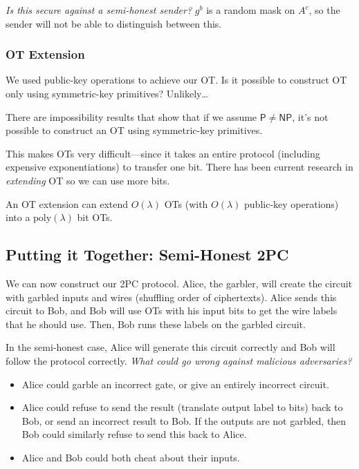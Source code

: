 \emph{Is this secure against a semi-honest sender?} $g^b$ is a random mask on $A^c$, so the sender will not be able to distinguish between this.

\subsubsection{OT Extension}
We used public-key operations to achieve our OT. Is it possible to construct OT only using symmetric-key primitives? Unlikely\dots

There are impossibility results that show that if we assume $\mathsf{P}\neq \mathsf{NP}$, it's not possible to construct an OT using symmetric-key primitives.

This makes OTs very difficult---since it takes an entire protocol (including expensive exponentiations) to transfer one bit. There has been current research in \emph{extending} OT so we can use more bits.

An OT extension can extend $O(\lambda)$ OTs (with $O(\lambda)$ public-key operations) into a $\mathrm{poly}(\lambda)$ bit OTs.


\subsection{Putting it Together: Semi-Honest 2PC}\label{sec:mar23-semihonest-2pc-together}

We can now construct our 2PC protocol. Alice, the garbler, will create the circuit with garbled inputs and wires (shuffling order of ciphertexts). Alice sends this circuit to Bob, and Bob will use OTs with his input bits to get the wire labels that he should use. Then, Bob runs these labels on the garbled circuit.


In the semi-honest case, Alice will generate this circuit correctly and Bob will follow the protocol correctly. \emph{What could go wrong against malicious adversaries?}
\begin{itemize}
    \item Alice could garble an incorrect gate, or give an entirely incorrect circuit.
    \item Alice could refuse to send the result (translate output label to bits) back to Bob, or send an incorrect result to Bob. If the outputs are not garbled, then Bob could similarly refuse to send this back to Alice.
    \item Alice and Bob could both cheat about their inputs.
\end{itemize}